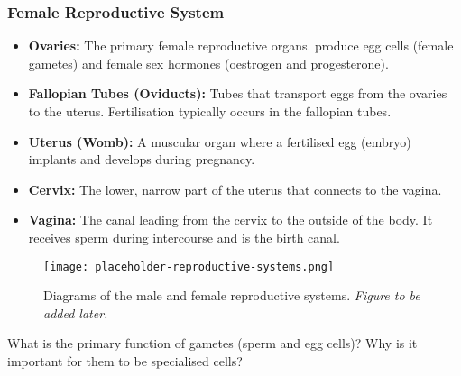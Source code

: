 \subsubsection{Female Reproductive System}

\begin{itemize}
    \item \textbf{Ovaries:}  The primary female reproductive organs.  produce egg cells (female gametes) and female sex hormones (oestrogen and progesterone).
    \item \textbf{Fallopian Tubes (Oviducts):}  Tubes that transport eggs from the ovaries to the uterus. Fertilisation typically occurs in the fallopian tubes.
    \item \textbf{Uterus (Womb):}  A muscular organ where a fertilised egg (embryo) implants and develops during pregnancy.
    \item \textbf{Cervix:}  The lower, narrow part of the uterus that connects to the vagina.
    \item \textbf{Vagina:}  The canal leading from the cervix to the outside of the body. It receives sperm during intercourse and is the birth canal.
\end{itemize}

\begin{figure}[htb]
    \centering
    \texttt{[image: placeholder-reproductive-systems.png]}
    \caption{Diagrams of the male and female reproductive systems. \textit{Figure to be added later.}}
    \label{fig:reproductive-systems}
\end{figure}

\begin{stopandthink}
What is the primary function of gametes (sperm and egg cells)? Why is it important for them to be specialised cells?
\end{stopandthink}


